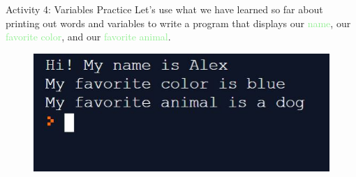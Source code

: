 \documentclass[hyperref={pdfpagemode=FullScreen},aspectratio=169]{beamer}
\begin{document}
  \begin{frame}{Activity 4: Variables Practice}
    Let's use what we have learned so far about printing out words and variables to write a program that displays our \textcolor{lightGreen}{name}, our \textcolor{lightGreen}{favorite color}, and our \textcolor{lightGreen}{favorite animal}. 

    \begin{figure}
      \includegraphics[scale=0.75]{./imgs/activityFourConsoleOutput.jpg}
    \end{figure}

  \end{frame}
\end{document}
